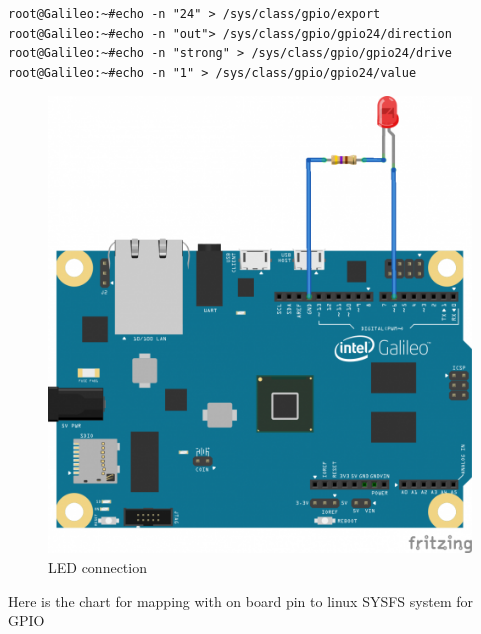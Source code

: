 \documentclass[11pt,a4paper]{article}
\newcommand\tab[1][1cm]{\hspace*{#1}}
\begin{document}
\begin{lstlisting}
root@Galileo:~#echo -n "24" > /sys/class/gpio/export
root@Galileo:~#echo -n "out"> /sys/class/gpio/gpio24/direction
root@Galileo:~#echo -n "strong" > /sys/class/gpio/gpio24/drive
root@Galileo:~#echo -n "1" > /sys/class/gpio/gpio24/value
\end{lstlisting}
\vspace{.3cm}
\begin{figure}
	\includegraphics[width=\linewidth]{9.png}
    \caption{LED connection}
    \end{figure}

\vspace{.3cm}
\tab{Here 27 is allocated for digital pin 6 so connect your LED at digital pin number 70}
\newpage
Here is the chart for mapping with on board pin to linux SYSFS system for GPIO\\
\end{document}
